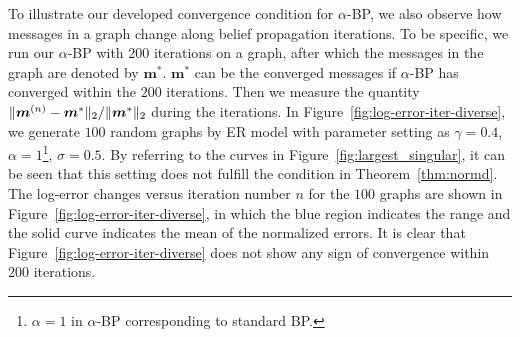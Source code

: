 To illustrate our developed convergence condition for $\alpha$-BP, we also observe how messages in a graph change along belief propagation iterations. To be specific, we run our $\alpha$-BP with $200$ iterations on a graph, after which the messages in the graph are denoted by $\bm{m}^{\ast}$. $\bm{m}^{\ast}$ can be the converged messages if $\alpha$-BP has converged within the $200$ iterations. Then we measure the quantity $\| \bm{m}^{(n)} - \bm{m}^{\ast} \|_{2}/\| \bm{m}^{\ast} \|_{2}$ during the iterations. In Figure~\ref{fig:log-error-iter-diverse}, we generate $100$ random graphs by ER model with parameter setting as $\gamma =0.4$, $\alpha = 1$\footnote{$\alpha=1$ in $\alpha$-BP corresponding to standard BP.}, $\sigma = 0.5$. By referring to the curves in Figure~\ref{fig:largest_singular}, it can be seen that this setting does not fulfill the condition in Theorem~\ref{thm:normd}. The log-error changes versus iteration number $n$ for the $100$ graphs are shown in Figure~\ref{fig:log-error-iter-diverse}, in which the blue region indicates the range and the solid curve indicates the mean of the normalized errors. It is clear that Figure~\ref{fig:log-error-iter-diverse} does not show any sign of convergence within $200$ iterations.

